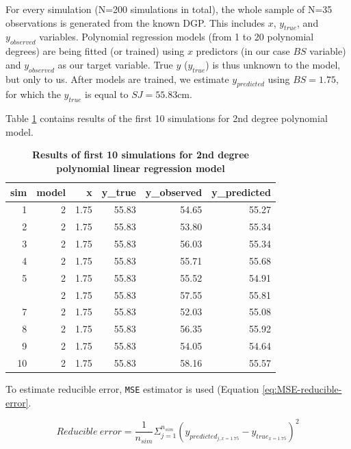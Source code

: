 \documentclass[
]{book}
\begin{document}
For every simulation (N=200 simulations in total), the whole sample of N=35 observations is generated from the known DGP. This includes \(x\), \(y_{true}\), and \(y_{observed}\) variables. Polynomial regression models (from 1 to 20 polynomial degrees) are being fitted (or trained) using \(x\) predictors (in our case \(BS\) variable) and \(y_{observed}\) as our target variable. True \(y\) (\(y_{true}\)) is thus unknown to the model, but only to us. After models are trained, we estimate \(y_{predicted}\) using \(BS = 1.75\), for which the \(y_{true}\) is equal to \(SJ=55.83\)cm.

Table \ref{tab:ten-simulations-bias-variance} contains results of the first 10 simulations for 2nd degree polynomial model.



\begin{table}

\caption{\label{tab:ten-simulations-bias-variance}\textbf{Results of first 10 simulations for 2nd degree polynomial linear regression model}}
\centering
\begin{tabular}[t]{rrrrrr}
\toprule
sim & model & x & y\_true & y\_observed & y\_predicted\\
\midrule
1 & 2 & 1.75 & 55.83 & 54.65 & 55.27\\
2 & 2 & 1.75 & 55.83 & 53.80 & 55.34\\
3 & 2 & 1.75 & 55.83 & 56.03 & 55.34\\
4 & 2 & 1.75 & 55.83 & 55.71 & 55.68\\
5 & 2 & 1.75 & 55.83 & 55.52 & 54.91\\
\addlinespace
6 & 2 & 1.75 & 55.83 & 57.55 & 55.81\\
7 & 2 & 1.75 & 55.83 & 52.03 & 55.08\\
8 & 2 & 1.75 & 55.83 & 56.35 & 55.92\\
9 & 2 & 1.75 & 55.83 & 54.05 & 54.64\\
10 & 2 & 1.75 & 55.83 & 58.16 & 55.57\\
\bottomrule
\end{tabular}
\end{table}

To estimate reducible error, \texttt{MSE} estimator is used (Equation \eqref{eq:MSE-reducible-error}.

\begin{equation}
  Reducible \: error = \frac{1}{n_{sim}}\Sigma_{j=1}^{n_{sim}}(y_{predicted_{j,x=1.75}} - y_{true_{x=1.75}})^2
  \label{eq:MSE-reducible-error}
\end{equation}
\end{document}
